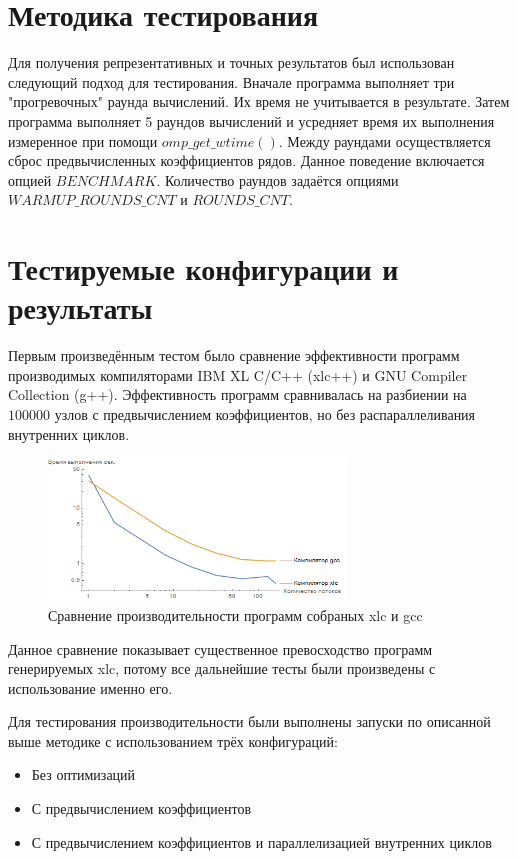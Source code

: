 \documentclass[a4paper,12pt,titlepage,finall]{article}
\begin{document}
\section{Методика тестирования}
Для получения репрезентативных и точных результатов был использован следующий подход для тестирования. Вначале программа выполняет три "прогревочных" раунда вычислений. Их время не учитывается в результате. Затем программа выполняет 5 раундов вычислений и усредняет время их выполнения измеренное при помощи $omp\_get\_wtime()$. Между раундами осуществляется сброс предвычисленных коэффициентов рядов. Данное поведение включается опцией $BENCHMARK$. Количество раундов задаётся опциями $WARMUP\_ROUNDS\_CNT$ и $ROUNDS\_CNT$.

\newpage
\section{Тестируемые конфигурации и результаты}
Первым произведённым тестом было сравнение эффективности программ производимых компиляторами IBM XL C/C++ (xlc++) и GNU Compiler Collection (g++). Эффективность программ сравнивалась на разбиении на $100 000$ узлов с предвычислением коэффициентов, но без распараллеливания внутренних циклов.
\begin{figure}[h]
\centering
\includegraphics[width=0.7\textwidth]{plot_compilers.png}
\caption{Сравнение производительности программ собраных xlc и gcc}
\end{figure}
\par
Данное сравнение показывает существенное превосходство программ генерируемых xlc, потому все дальнейшие тесты были произведены с использование именно его.
\par
Для тестирования производительности были выполнены запуски по описанной выше методике с использованием трёх конфигураций:
\begin{itemize}
\item Без оптимизаций
\item С предвычислением коэффициентов
\item С предвычислением коэффициентов и параллелизацией внутренних циклов
\end{itemize}
\end{document}
